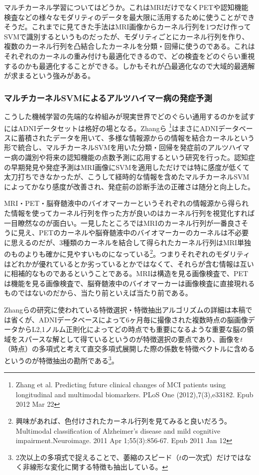 マルチカーネル学習についてはどうか。これはMRIだけでなくPETや認知機能検査などの様々なモダリティのデータを最大限に活用するために使うことができそうだ。これまでに見てきた手法はMRI画像からカーネル行列を1つだけ作ってSVMで識別するというものだったが、モダリティごとにカーネル行列を作り、複数のカーネル行列を凸結合したカーネルを分類・回帰に使うのである。これはそれぞれのカーネルの重み付けも最適化できるので、どの検査をどのぐらい重視するのかも最適化することができる。しかもそれが凸最適化なので大域的最適解が求まるという強みがある。
\subsubsection{マルチカーネルSVMによるアルツハイマー病の発症予測}
こうした機械学習の先端的な枠組みが現実世界でどのぐらい通用するのかを試すにはADNIデータセットは格好の場となる。Zhangら
\footnote{Zhang et al. Predicting future clinical changes of MCI patients using longitudinal and multimodal biomarkers. PLoS One (2012),7(3),e33182. Epub 2012 Mar 22}はまさにADNIデータベースに蓄積されたデータを用いて、多様な情報源からの情報を結合カーネルという形で統合し、マルチカーネルSVMを用いた分類・回帰を発症前のアルツハイマー病の識別や将来の認知機能の点数予測に応用するという研究を行った。認知症の早期発見や発症予測はMRI画像にSVMを適用しただけでは特に感度が低くて太刀打ちできなかったが、こうして経時的な情報を含めたマルチカーネルSVMによってかなり感度が改善され、発症前の診断手法の正確さは随分と向上した。

MRI・PET・脳脊髄液中のバイオマーカーというそれぞれの情報源から得られた情報を使ってカーネル行列を作った方が良いのはカーネル行列を視覚化すれば一目瞭然なのが面白い。一見したところではMRIのカーネル行列が一番良さそうに見え、PETのカーネルや脳脊髄液中のバイオマーカーのカーネルは不必要に思えるのだが、3種類のカーネルを結合して得られたカーネル行列はMRI単独のものよりも確かに見やすいものになっている\footnote{興味があれば、色付けされたカーネル行列を見てみると良いだろう。Multimodal classification of Alzheimer's disease and mild cognitive impairment.Neuroimage. 2011 Apr 1;55(3):856-67. Epub 2011 Jan 12}。つまりそれぞれのモダリティはどれかが優れているとか劣っているとかではなくて、それらが含む情報は互いに相補的なものであるということである。MRIは構造を見る画像検査で、PETは機能を見る画像検査で、脳脊髄液中のバイオマーカーは画像検査に直接現れるものではないのだから、当たり前といえば当たり前である。

Zhangらの研究に使われている特徴選択・特徴抽出アルゴリズムの詳細は本稿では省くが、ADNIデータベースによって6ヶ月毎に撮像された複数時点の脳画像データからL2,1ノルム正則化によってどの時点でも重要になるような重要な脳の領域をスパースな解として得ているというのが特徴選択の要点であり、画像を$t$（時点）の多項式と考えて直交多項式展開した際の係数を特徴ベクトルに含めるというのが特徴抽出の勘所である\footnote{2次以上の多項式で捉えることで、萎縮のスピード（$t$の一次式）だけではなく非線形な変化に関する特徴も抽出している。}。

